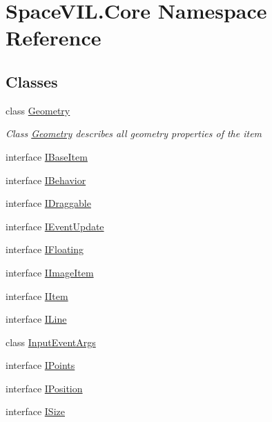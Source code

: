 \hypertarget{namespace_space_v_i_l_1_1_core}{}\section{Space\+V\+I\+L.\+Core Namespace Reference}
\label{namespace_space_v_i_l_1_1_core}
\subsection*{Classes}
\begin{DoxyCompactItemize}
\item 
class \mbox{\hyperlink{class_space_v_i_l_1_1_core_1_1_geometry}{Geometry}}
\begin{DoxyCompactList}\small\item\em Class \mbox{\hyperlink{class_space_v_i_l_1_1_core_1_1_geometry}{Geometry}} describes all geometry properties of the item \end{DoxyCompactList}\item 
interface \mbox{\hyperlink{interface_space_v_i_l_1_1_core_1_1_i_base_item}{I\+Base\+Item}}
\item 
interface \mbox{\hyperlink{interface_space_v_i_l_1_1_core_1_1_i_behavior}{I\+Behavior}}
\item 
interface \mbox{\hyperlink{interface_space_v_i_l_1_1_core_1_1_i_draggable}{I\+Draggable}}
\item 
interface \mbox{\hyperlink{interface_space_v_i_l_1_1_core_1_1_i_event_update}{I\+Event\+Update}}
\item 
interface \mbox{\hyperlink{interface_space_v_i_l_1_1_core_1_1_i_floating}{I\+Floating}}
\item 
interface \mbox{\hyperlink{interface_space_v_i_l_1_1_core_1_1_i_image_item}{I\+Image\+Item}}
\item 
interface \mbox{\hyperlink{interface_space_v_i_l_1_1_core_1_1_i_item}{I\+Item}}
\item 
interface \mbox{\hyperlink{interface_space_v_i_l_1_1_core_1_1_i_line}{I\+Line}}
\item 
class \mbox{\hyperlink{class_space_v_i_l_1_1_core_1_1_input_event_args}{Input\+Event\+Args}}
\item 
interface \mbox{\hyperlink{interface_space_v_i_l_1_1_core_1_1_i_points}{I\+Points}}
\item 
interface \mbox{\hyperlink{interface_space_v_i_l_1_1_core_1_1_i_position}{I\+Position}}
\item 
interface \mbox{\hyperlink{interface_space_v_i_l_1_1_core_1_1_i_size}{I\+Size}}

\end{DoxyCompactItemize}
